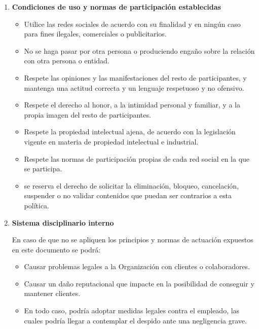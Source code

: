 \begin{enumerate}[label=\alph*)]
\item \textbf{Condiciones de uso y normas de participación establecidas}
\begin{itemize}
    \item Utilice las redes sociales de acuerdo con su finalidad y en ningún caso para fines ilegales, comerciales o publicitarios.
    \item No se haga pasar por otra persona o produciendo engaño sobre la relación con otra persona o entidad.
    \item Respete las opiniones y las manifestaciones del resto de participantes, y mantenga una actitud correcta y un lenguaje respetuoso y no ofensivo.
    \item Respete el derecho al honor, a la intimidad personal y familiar, y a la propia imagen del resto de participantes.
    \item Respete la propiedad intelectual ajena, de acuerdo con la legislación vigente en materia de propiedad intelectual e industrial.
    \item Respete las normas de participación propias de cada red social en la que se participa.
    \item \Beneficiario{} se reserva el derecho de solicitar la eliminación, bloqueo, cancelación, suspender o no validar contenidos que puedan ser contrarios a esta política.
\end{itemize}

\item \textbf{Sistema disciplinario interno}

En caso de que no se apliquen los principios y normas de actuación expuestos en este documento se podrá:

\begin{itemize}
    \item Causar problemas legales a la Organización con clientes o colaboradores.
    \item Causar un daño reputacional que impacte en la posibilidad de conseguir y mantener clientes.
    \item En todo caso, \Beneficiario{} podría adoptar medidas legales contra el empleado, las cuales podría llegar a contemplar el despido ante una negligencia grave.
\end{itemize}

\end{enumerate}